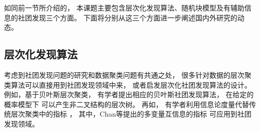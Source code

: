 如同前一节所介绍的， 本课题主要包含层次化发现算法、随机块模型及有辅助信息的社团发现三个方面。
下面将分别从这三个方面进一步阐述国内外研究的动态。
\subsection{层次化发现算法}
考虑到社团发现问题的研究和数据聚类问题有共通之处，
很多针对数据的层次聚类算法可以直接用到社团发现领域中来，
或者启发层次化社团发现算法的设计。
例如，基于贝叶斯层次聚类\cite{heller2005bhc}，
有学者提出相应的贝叶斯社团发现算法\cite{blundell2011discovering, blundell2013bhcd}，
在给定的概率模型下
可以产生非二叉结构的层次树。
再如，
有学者利用信息论度量代替传统层次聚类中的指标
\cite{gokcay2002clustering,aghagolzadeh2007hierarchical,chan2016ic}，
其中，Chan等\cite{chan2016ic}提出的多变量互信息的指标
可应用到社团发现领域\cite{chan2017pin}。

